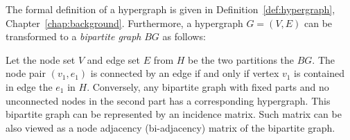 The formal definition of a hypergraph is given in Definition~\ref{def:hypergraph}, Chapter~\ref{chap:background}. Furthermore, a hypergraph $G = (V, E)$ can be transformed to a \emph{bipartite graph} $BG$ as follows:

\begin{mydef}
Let the node set $V$ and edge set $E$ from $H$ be the two partitions the $BG$. The node pair $(v_1, e_1)$ is connected by an edge if and only if vertex $v_1$ is contained in edge the $e_1$ in $H$. Conversely, any bipartite graph with fixed parts and no unconnected nodes in the second part has a corresponding hypergraph. This bipartite graph can be represented by an incidence matrix. Such matrix can be also viewed as a node adjacency (bi-adjacency) matrix of the bipartite graph.
\end{mydef}
